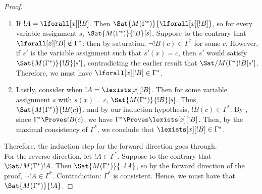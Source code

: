 \documentclass[../../include/open-logic-section]{subfiles}
\begin{document}
\begin{proof}
\begin{enumerate}
\item {} If $!A= \lforall[x][!B]$. Then $\Sat{M(\Gamma^*)}{\lforall[x][!B]}$, so for every variable assignment $s$, 
$\Sat{M(\Gamma^*)}{!B}[s]$. Suppose to the contrary that $\lforall[x][!B]\notin \Gamma^*$: then by saturation, 
$\lnot !B(c) \in \Gamma^*$ for some $c$. However, if $s'$ is the variable assignment such that $s'(x)=c$, then 
$s'$ would satisfy $\Sat{M(\Gamma^*)}{!B}[s']$, contradicting the earlier result that $\Sat/{M(\Gamma^*)}{!B}[s']$. 
Therefore, we must have $\lforall[x][!B] \in \Gamma^*$.

\item {} Lastly, consider when $!A = \lexists[x][!B]$. Then for some variable assignment $s$ with $s(x)=c$, 
$\Sat{M(\Gamma^*)}{!B}[s]$. Thus, $\Sat{M(\Gamma^*)}{!B(c)}$, and by our induction hypothesis, $!B(c) \in \Gamma^*$. 
By , since $\Gamma^* \Proves !B(c)$, we have $\Gamma^* \Proves \lexists[x][!B]$. 
Then, by the maximal consistency of $\Gamma^*$, we conclude that $\lexists[x][!B] \in \Gamma^*$.

\end{enumerate}

Therefore, the induction step for the forward direction goes through.\\

For the reverse direction, let $!A \in \Gamma^*$. Suppose to the contrary that $\Sat/{M(\Gamma^*)}{!A}$. Then 
$\Sat{M(\Gamma^*)}{\lnot !A}$, so by the forward direction of the proof, $\lnot !A \in \Gamma^*$. Contradiction: $\Gamma^*$ 
is consistent. Hence, we must have that $\Sat{M(\Gamma^*)}{!A}$.

\end{proof}
\end{document}
